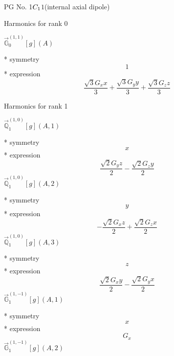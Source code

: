\documentclass[fleqn,8pt]{jsarticle}
\begin{document}
\setcounter{MaxMatrixCols}{32}

\renewcommand{\tablename}{Table~}
\renewcommand{\figurename}{Figure~}
\begin{center}
\LARGE
PG No. 1\quad$C_{\rm 1}$\quad$1$\quad[ triclinic ] (internal axial dipole)
\end{center}

\noindent * Harmonics for rank 0

\noindent\quad $\vec{\mathbb{G}}_{0}^{(1,1)}[g](A)$

\noindent\quad ** symmetry
\begin{dmath*}
1
\end{dmath*}
\noindent\quad ** expression
\begin{dmath*}
\frac{\sqrt{3} G_{x} x}{3} + \frac{\sqrt{3} G_{y} y}{3} + \frac{\sqrt{3} G_{z} z}{3}
\end{dmath*}

\noindent * Harmonics for rank 1

\noindent\quad $\vec{\mathbb{Q}}_{1}^{(1,0)}[g](A,1)$

\noindent\quad ** symmetry
\begin{dmath*}
x
\end{dmath*}
\noindent\quad ** expression
\begin{dmath*}
\frac{\sqrt{2} G_{y} z}{2} - \frac{\sqrt{2} G_{z} y}{2}
\end{dmath*}
\noindent\quad $\vec{\mathbb{Q}}_{1}^{(1,0)}[g](A,2)$

\noindent\quad ** symmetry
\begin{dmath*}
y
\end{dmath*}
\noindent\quad ** expression
\begin{dmath*}
- \frac{\sqrt{2} G_{x} z}{2} + \frac{\sqrt{2} G_{z} x}{2}
\end{dmath*}
\noindent\quad $\vec{\mathbb{Q}}_{1}^{(1,0)}[g](A,3)$

\noindent\quad ** symmetry
\begin{dmath*}
z
\end{dmath*}
\noindent\quad ** expression
\begin{dmath*}
\frac{\sqrt{2} G_{x} y}{2} - \frac{\sqrt{2} G_{y} x}{2}
\end{dmath*}
\noindent\quad $\vec{\mathbb{G}}_{1}^{(1,-1)}[g](A,1)$

\noindent\quad ** symmetry
\begin{dmath*}
x
\end{dmath*}
\noindent\quad ** expression
\begin{dmath*}
G_{x}
\end{dmath*}
\noindent\quad $\vec{\mathbb{G}}_{1}^{(1,-1)}[g](A,2)$
\end{document}
